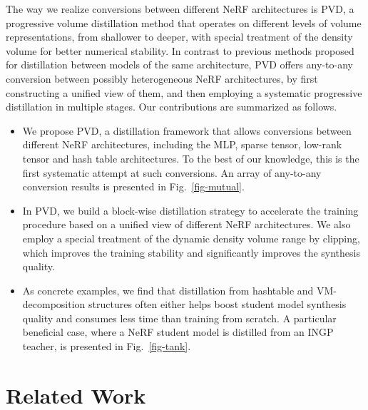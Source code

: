 \documentclass[letterpaper]{article} \usepackage{aaai23}  \usepackage{times}  \usepackage{helvet}  \usepackage{courier}  \usepackage[hyphens]{url}  \usepackage{graphicx} \urlstyle{rm} \def\UrlFont{\rm}  \usepackage{natbib}  \usepackage{caption} \frenchspacing  \setlength{\pdfpagewidth}{8.5in}  \setlength{\pdfpageheight}{11in}  \usepackage{multirow}
\begin{document}
The way we realize conversions between different NeRF architectures is PVD, a progressive volume distillation method that operates on different levels of volume representations, from shallower to deeper, with special treatment of the density volume for better numerical stability. In contrast to previous methods proposed for distillation between models of the same architecture, PVD offers any-to-any conversion between possibly heterogeneous NeRF architectures, by first constructing a unified view of them, and then employing a systematic progressive distillation in multiple stages.
Our contributions are summarized as follows.
\begin{itemize}
\item We propose PVD, a distillation framework that allows conversions between different NeRF architectures, including the MLP, sparse tensor, low-rank tensor and hash table architectures. To the best of our knowledge, this is the first systematic attempt at such conversions. An array of any-to-any conversion results is presented in Fig.~\ref{fig-mutual}.\item In PVD, we build a block-wise distillation strategy to accelerate the training procedure based on a unified view of different NeRF architectures. We also employ a special treatment of the dynamic density volume range by clipping, which improves the training stability and significantly improves the synthesis quality.
\item As concrete examples, we find that distillation from hashtable and VM-decomposition structures often either helps boost student model synthesis quality and consumes less time than training from scratch. A particular beneficial case, where a NeRF student model is distilled from an INGP teacher, is presented in Fig.~\ref{fig-tank}.

\end{itemize}

\section{Related Work}
\end{document}
